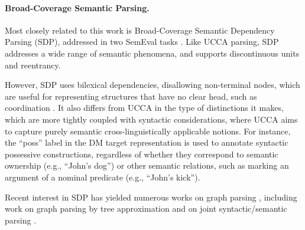 \documentclass[11pt,a4paper]{article}
\newcommand{\secref}[1]{Section~\ref{#1}}
\begin{document}
\paragraph{Broad-Coverage Semantic Parsing.}
Most closely related to this work is Broad-Coverage Semantic Dependency Parsing (SDP),
addressed in two SemEval tasks \cite{oepen2014semeval,oepen2015semeval}.
Like UCCA parsing, SDP addresses a wide range of semantic phenomena,
and supports discontinuous units and reentrancy.

However, SDP uses bilexical dependencies, disallowing non-terminal nodes, which
are useful for representing structures that have no clear head, such as coordination
\cite[see \secref{sec:ucca}]{Ivanova2012who}. It also differs from UCCA in the type
of distinctions it makes, which are more tightly coupled with syntactic considerations,
where UCCA aims to capture purely semantic cross-linguistically applicable notions.
For instance, the ``poss'' label in the DM target representation is used to
annotate syntactic possessive constructions, regardless of whether they correspond to
semantic ownership (e.g., ``John's dog'') or other semantic relations,
such as marking an argument of a nominal predicate (e.g., ``John's kick'').

Recent interest in SDP has yielded numerous works on graph parsing
\cite{ribeyre-villemontedelaclergerie-seddah:2014:SemEval,thomson-EtAl:2014:SemEval,almeida-martins:2015:SemEval,du-EtAl:2015:SemEval}, including work on graph parsing
by tree approximation \cite{agic-koller:2014:SemEval,schluter-EtAl:2014:SemEval}
and on joint syntactic/semantic parsing
\cite{henderson2013multilingual,swayamdipta-EtAl:2016:CoNLL}.
\end{document}
